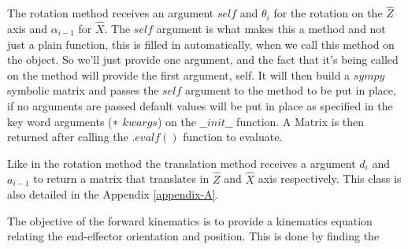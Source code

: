 \documentclass[transmag]{IEEEtran}
\begin{document}
The rotation method receives an argument $self$ and $\theta_i$ for the rotation on the $\hat Z$ axis and $\alpha_{i-1}$ for $\hat X$. The $self$ argument is what makes this a method and not just a plain function, this is filled in automatically, when we call this method on the object. So we'll just provide one argument, and the fact that it's being called on the method will provide the first argument, self. It will then build a $sympy$ symbolic matrix and passes the $self$ argument to the method to be put in place, if no arguments are passed default values will be put in place as specified in the key word arguments ($\**$ $kwargs$) on the $\_\_init\_\_$ function. A Matrix is then returned after calling the $.evalf()$ function to evaluate.

Like in the rotation method the translation method receives a argument $d_i$ and $a_{i-1}$ to return a matrix that translates in $\hat Z$ and $\hat X$ axis respectively. This class is also detailed in the Appendix \ref{appendix-A}.  

The objective of the forward kinematics is to provide a kinematics equation relating the end-effector orientation and position. This is done by finding the 
\end{document}
